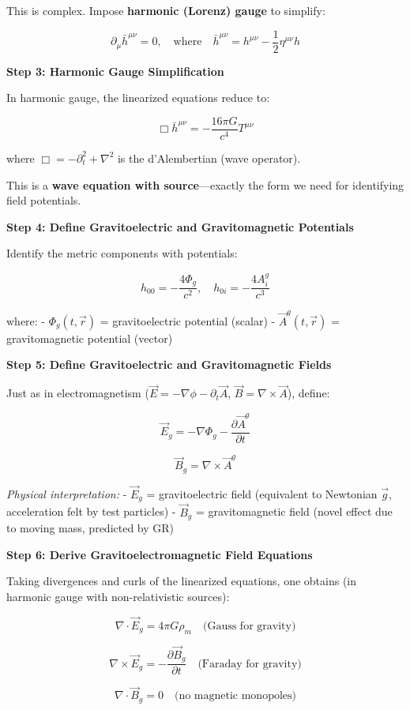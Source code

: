 \documentclass[
]{article}
\begin{document}
This is complex. Impose \textbf{harmonic (Lorenz) gauge} to simplify:

\[\partial_\mu \bar{h}^{\mu\nu} = 0, \quad \text{where} \quad \bar{h}^{\mu\nu} = h^{\mu\nu} - \frac{1}{2}\eta^{\mu\nu}h\]

\textbf{Step 3: Harmonic Gauge Simplification}

In harmonic gauge, the linearized equations reduce to:

\[\Box \bar{h}^{\mu\nu} = -\frac{16\pi G}{c^4} T^{\mu\nu}\]

where \(\Box = -\partial_t^2 + \nabla^2\) is the d'Alembertian (wave
operator).

This is a \textbf{wave equation with source}---exactly the form we need
for identifying field potentials.

\textbf{Step 4: Define Gravitoelectric and Gravitomagnetic Potentials}

Identify the metric components with potentials:

\[h_{00} = -\frac{4\Phi_g}{c^2}, \quad h_{0i} = -\frac{4A_i^g}{c^3}\]

where: - \(\Phi_g(t, \vec{r})\) = gravitoelectric potential (scalar) -
\(\vec{A}^g(t, \vec{r})\) = gravitomagnetic potential (vector)

\textbf{Step 5: Define Gravitoelectric and Gravitomagnetic Fields}

Just as in electromagnetism
(\(\vec{E} = -\nabla\phi - \partial_t \vec{A}\),
\(\vec{B} = \nabla \times \vec{A}\)), define:

\[\vec{E}_g = -\nabla\Phi_g - \frac{\partial \vec{A}^g}{\partial t}\]

\[\vec{B}_g = \nabla \times \vec{A}^g\]

\emph{Physical interpretation:} - \(\vec{E}_g\) = gravitoelectric field
(equivalent to Newtonian \(\vec{g}\), acceleration felt by test
particles) - \(\vec{B}_g\) = gravitomagnetic field (novel effect due to
moving mass, predicted by GR)

\textbf{Step 6: Derive Gravitoelectromagnetic Field Equations}

Taking divergences and curls of the linearized equations, one obtains
(in harmonic gauge with non-relativistic sources):

\[\nabla \cdot \vec{E}_g = 4\pi G \rho_m \quad \text{(Gauss for gravity)}\]

\[\nabla \times \vec{E}_g = -\frac{\partial \vec{B}_g}{\partial t} \quad \text{(Faraday for gravity)}\]

\[\nabla \cdot \vec{B}_g = 0 \quad \text{(no magnetic monopoles)}\]
\end{document}
